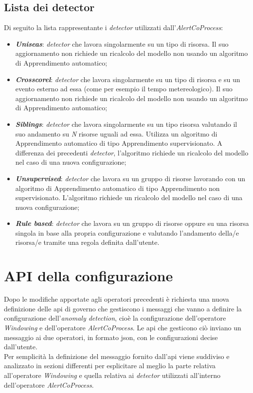 \subsection{Lista dei detector}\label{sec:detector-alertcoprocess}
Di seguito la lista rappresentante i \textit{detector} utilizzati dall'\textit{AlertCoProcess}:
\begin{itemize}
	\item{\textbf{\textit{Uniseas}}: \textit{detector} che lavora singolarmente su un tipo di risorsa. Il suo aggiornamento non richiede un ricalcolo del modello non usando un algoritmo di \gls{Apprendimento automatico};}
	\item{\textbf{\textit{Crosscorel}}: \textit{detector} che lavora singolarmente su un tipo di risorsa e su un evento esterno ad essa (come per esempio il tempo metereologico). Il suo aggiornamento non richiede un ricalcolo del modello non usando un algoritmo di \gls{Apprendimento automatico};}
	\item{\textbf{\textit{Siblings}}: \textit{detector} che lavora singolarmente su un tipo risorsa valutando il suo andamento su \textit{N} risorse uguali ad essa. Utilizza un algoritmo di \gls{Apprendimento automatico} di tipo \gls{Apprendimento supervisionato}. A differenza dei precedenti \textit{detector}, l'algoritmo richiede un ricalcolo del modello nel caso di una nuova configurazione;}
	\item{\textbf{\textit{Unsupervised}}: \textit{detector} che lavora su un gruppo di risorse lavorando con un algoritmo di \gls{Apprendimento automatico} di tipo \gls{Apprendimento non supervisionato}. L'algoritmo richiede un ricalcolo del modello nel caso di una nuova configurazione;}
	\item{\textbf{\textit{Rule based}}: \textit{detector} che lavora su un gruppo di risorse oppure su una risorsa singola in base alla propria configurazione e valutando l'andamento della/e risorsa/e tramite una regola definita dall'utente.}
\end{itemize}


\section{API della configurazione}
Dopo le modifiche apportate agli operatori precedenti è richiesta una nuova definizione delle \gls{api} di governo che gestiscono i messaggi che vanno a definire la configurazione dell'\textit{anomaly detection}, cioè la configurazione dell'operatore \textit{Windowing} e dell'operatore \textit{AlertCoProcess}. Le \gls{api} che gesticono ciò inviano un messaggio ai due operatori, in formato \gls{json}, con le configurazioni decise dall'utente.\\
Per semplicità la definizione del messaggio fornito dall'\gls{api} viene suddiviso e analizzato in sezioni differenti per esplicitare al meglio la parte relativa all'operatore \textit{Windowing} e quella relativa ai \textit{detector} utilizzati all'interno dell'operatore \textit{AlertCoProcess}.




